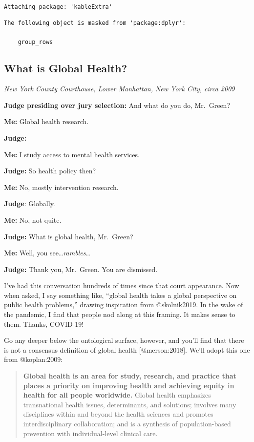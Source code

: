 \documentclass[
  letterpaper,
  DIV=11,
  numbers=noendperiod,
  oneside]{scrartcl}
\begin{document}
\begin{verbatim}

Attaching package: 'kableExtra'
\end{verbatim}

\begin{verbatim}
The following object is masked from 'package:dplyr':

    group_rows
\end{verbatim}

\hypertarget{what-is-global-health}{%
\subsection{What is Global Health?}\label{what-is-global-health}}

\emph{New York County Courthouse, Lower Manhattan, New York City, circa
2009}

\textbf{Judge presiding over jury selection:} And what do you do,
Mr.~Green?

\textbf{Me:} Global health research.

\textbf{Judge:}

\textbf{Me:} I study access to mental health services.

\textbf{Judge:} So health policy then?

\textbf{Me:} No, mostly intervention research.

\textbf{Judge}: Globally.

\textbf{Me:} No, not quite.

\textbf{Judge:} What is global health, Mr.~Green?

\textbf{Me:} Well, you see\ldots{}\emph{rambles}\ldots{}

\textbf{Judge:} Thank you, Mr.~Green. You are dismissed.

I've had this conversation hundreds of times since that court
appearance. Now when asked, I say something like, ``global health takes
a global perspective on public health problems,'' drawing inspiration
from @skolnik2019. In the wake of the pandemic, I find that people nod
along at this framing. It makes sense to them. Thanks, COVID-19!

Go any deeper below the ontological surface, however, and you'll find
that there is not a consensus definition of global health
{[}@merson:2018{]}. We'll adopt this one from @koplan:2009:

\begin{quote}
\textbf{Global health is an area for study, research, and practice that
places a priority on improving health and achieving equity in health for
all people worldwide.} Global health emphasizes transnational health
issues, determinants, and solutions; involves many disciplines within
and beyond the health sciences and promotes interdisciplinary
collaboration; and is a synthesis of population-based prevention with
individual-level clinical care.
\end{quote}
\end{document}
